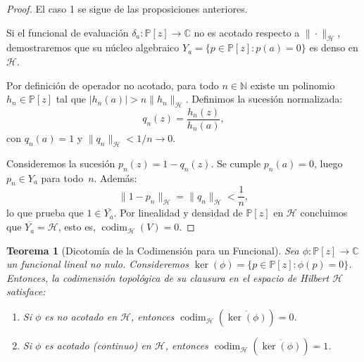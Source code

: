 \documentclass[12pt,a4paper]{article}
\newtheorem{theorem}{Teorema}
\theoremstyle{definition}
\theoremstyle{remark}
\newcommand{\C}{\mathbb{C}}
\newcommand{\Poly}{\mathbb{P}[z]}
\begin{document}
\begin{proof}
  El caso 1 se sigue de las proposiciones anteriores.

  Si el funcional de evaluación $\delta_a: \Poly \to \C$ no es acotado respecto a $\|\cdot\|_{\mathcal{H}}$, demostraremos que su núcleo algebraico $Y_a = \{p \in \Poly : p(a)=0\}$ es denso en $\mathcal{H}$.

  Por definición de operador no acotado, para todo $n \in \mathbb{N}$ existe un polinomio $h_n \in \Poly$ tal que $|h_n(a)| > n \|h_n\|_{\mathcal{H}}$. Definimos la sucesión normalizada:
  $$ q_n(z) = \frac{h_n(z)}{h_n(a)}, $$
  con $q_n(a) = 1$ y $\|q_n\|_{\mathcal{H}} < 1/n \to 0$.

  Consideremos la sucesión $p_n(z) = 1 - q_n(z)$. Se cumple $p_n(a) = 0$, luego $p_n \in Y_a$ para todo~$n$. Además:
  $$ \|1 - p_n\|_{\mathcal{H}} = \|q_n\|_{\mathcal{H}} < \frac{1}{n}, $$
  lo que prueba que $1 \in \overline{Y_a}$. Por linealidad y densidad de $\Poly$ en $\mathcal{H}$ concluimos que $\overline{Y_a} = \mathcal{H}$, esto es, $\operatorname{codim}_{\mathcal{H}}(V) = 0$.
\end{proof}

\begin{theorem}[Dicotomía de la Codimensión para un Funcional]\label{thm:dicotomia_1}
  Sea $\phi : \Poly \to \mathbb{C}$ un funcional lineal no nulo. Consideremos $\ker(\phi) = \{ p \in \Poly : \phi(p) = 0 \}$. Entonces, la codimensión topológica de su clausura en el espacio de Hilbert $\mathcal{H}$ satisface:
  \begin{enumerate}
    \item Si $\phi$ es no acotado en $\mathcal{H}$, entonces $\operatorname{codim}_\mathcal{H}(\overline{\ker(\phi)}) = 0$.
    \item Si $\phi$ es acotado (continuo) en $\mathcal{H}$, entonces $\operatorname{codim}_\mathcal{H}(\overline{\ker(\phi)}) = 1$.
  \end{enumerate}
\end{theorem}
\end{document}
